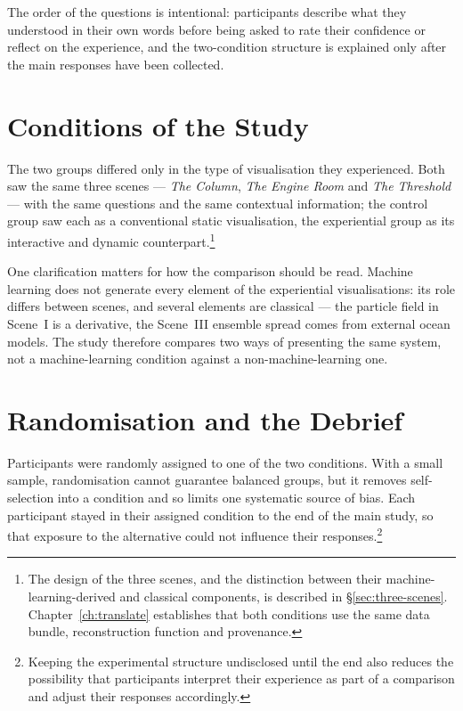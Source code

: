 The order of the questions is intentional: participants describe what they understood in their own words before being asked to rate their confidence or reflect on the experience, and the two-condition structure is explained only after the main responses have been collected.

\section{Conditions of the Study}
\label{sec:eval-conditions}

The two groups differed only in the type of visualisation they experienced. Both saw the same three scenes --- \textit{The Column}, \textit{The Engine Room} and \textit{The Threshold} --- with the same questions and the same contextual information; the control group saw each as a conventional static visualisation, the experiential group as its interactive and dynamic counterpart.\footnote{The design of the three scenes, and the distinction between their machine-learning-derived and classical components, is described in \S\ref{sec:three-scenes}. Chapter~\ref{ch:translate} establishes that both conditions use the same data bundle, reconstruction function and provenance.}

One clarification matters for how the comparison should be read. Machine learning does not generate every element of the experiential visualisations: its role differs between scenes, and several elements are classical --- the particle field in Scene~I is a derivative, the Scene~III ensemble spread comes from external ocean models. The study therefore compares two ways of presenting the same system, not a machine-learning condition against a non-machine-learning one.

\section{Randomisation and the Debrief}
\label{sec:eval-randomisation}

Participants were randomly assigned to one of the two conditions. With a small sample, randomisation cannot guarantee balanced groups, but it removes self-selection into a condition and so limits one systematic source of bias. Each participant stayed in their assigned condition to the end of the main study, so that exposure to the alternative could not influence their responses.\footnote{Keeping the experimental structure undisclosed until the end also reduces the possibility that participants interpret their experience as part of a comparison and adjust their responses accordingly.}

